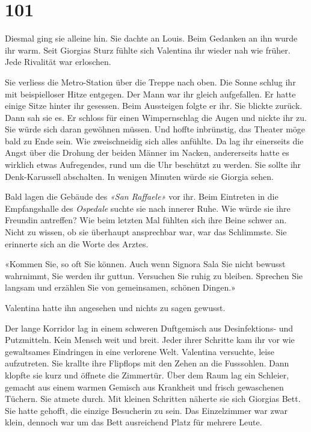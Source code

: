 \chapter{101}



Diesmal ging sie alleine hin. Sie dachte an Louis. Beim Gedanken an ihn wurde ihr warm.
Seit Giorgias Sturz fühlte sich Valentina ihr wieder nah wie früher.
Jede Rivalität war erloschen.

Sie verliess die Metro-Station über die Treppe nach oben. Die Sonne
schlug ihr mit beispielloser Hitze entgegen. Der Mann war ihr gleich
aufgefallen. Er hatte einige Sitze hinter ihr gesessen. Beim Aussteigen
folgte er ihr. Sie blickte zurück. Dann sah sie es. Er schloss für einen
Wimpernschlag die Augen und nickte ihr zu.
Sie würde sich daran gewöhnen müssen. Und hoffte inbrünstig, das Theater
möge bald zu Ende sein.
Wie zweischneidig sich alles anfühlte. Da lag ihr einerseits die Angst
über die Drohung der beiden Männer im Nacken, andererseits
hatte es wirklich etwas Aufregendes, rund um die Uhr beschützt zu werden. Sie
sollte ihr Denk-Karussell abschalten. In wenigen Minuten würde sie
Giorgia sehen.

Bald lagen die Gebäude des \emph{«San Raffaele»} vor ihr. Beim Eintreten
in die Empfangshalle des \emph{Ospedale} suchte sie nach innerer 
Ruhe. Wie würde sie ihre Freundin antreffen? Wie beim letzten Mal fühlten sich ihre Beine schwer an. Nicht zu wissen, ob sie überhaupt ansprechbar war, war das Schlimmste. Sie erinnerte sich an die Worte des Arztes.

«Kommen Sie, so oft Sie können. Auch wenn Signora Sala Sie nicht bewusst
wahrnimmt, Sie werden ihr guttun. Versuchen Sie ruhig zu bleiben.
Sprechen Sie langsam und erzählen Sie von gemeinsamen, schönen Dingen.»

Valentina hatte ihn angesehen und nichts zu sagen gewusst.

Der lange Korridor lag in einem schweren Duftgemisch aus
Desinfektions- und Putzmitteln. Kein Mensch weit und breit. Jeder ihrer Schritte
kam ihr vor wie gewaltsames Eindringen in eine verlorene Welt.
Valentina versuchte, leise aufzutreten. Sie krallte ihre Flipflops mit
den Zehen an die Fusssohlen.
Dann klopfte sie kurz und öffnete die Zimmertür. Über dem Raum lag ein
Schleier, gemacht aus einem warmen Gemisch aus Krankheit und
frisch gewaschenen Tüchern. Sie atmete durch.
Mit kleinen Schritten näherte sie sich Giorgias Bett. Sie hatte gehofft,
die einzige Besucherin zu sein. Das Einzelzimmer war zwar klein, dennoch
war um das Bett ausreichend Platz für mehrere Leute.

